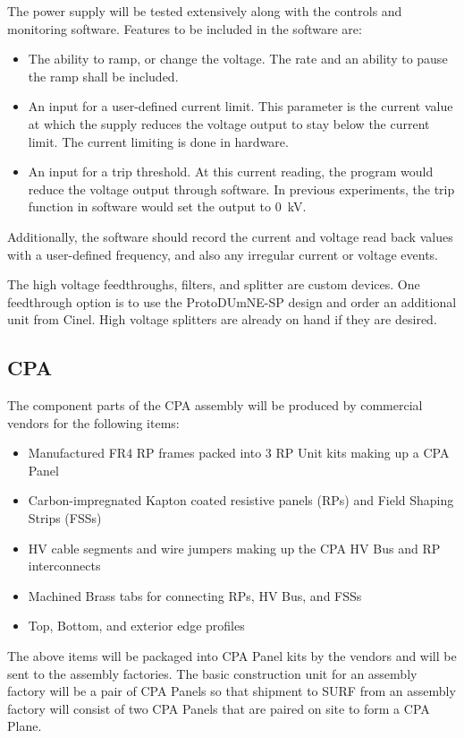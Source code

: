 The power supply will be tested extensively along with the controls and monitoring software.  Features to be included in the software are:
\begin{itemize}
\item The ability to ramp, or change the voltage.  The rate and an ability to pause the ramp shall be included.
\item An input for a user-defined current limit.  This parameter is the current value at which the supply reduces the voltage output to stay below the current limit.  The current limiting is done in hardware.
\item An input for a trip threshold.  At this current reading, the program would reduce the voltage output through software.  In previous experiments, the trip function in software would set the output to \SI{0}{kV}.
\end{itemize}
\noindent Additionally, the software should record the current and voltage read back values with a user-defined frequency, and also any irregular current or voltage events.

The high voltage feedthroughs, filters, and splitter are custom devices.  One feedthrough option is to use the ProtoDUmNE-SP design and order an additional unit from Cinel.  High voltage splitters are already on hand if they are desired.

\subsection{CPA}
\label{sec:fddp-hv-supplies}

The component parts of the CPA assembly will be produced by commercial vendors for the following items:
\begin{itemize}
\item Manufactured FR4 RP frames packed into 3 RP Unit kits making up a CPA Panel
\item Carbon-impregnated Kapton coated resistive panels (RPs) and Field Shaping Strips (FSSs)
\item HV cable segments and wire jumpers making up the CPA HV Bus and RP interconnects
\item Machined Brass tabs for connecting RPs, HV Bus, and FSSs
\item Top, Bottom, and exterior edge profiles
\end{itemize}
The above items will be packaged into CPA Panel kits by the vendors and will be sent to the assembly factories.  The basic construction unit for an assembly factory will be a pair of CPA Panels so that shipment to SURF from an assembly factory will consist of two CPA Panels that are paired on site to form a CPA Plane.

